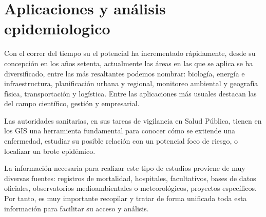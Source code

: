 \section{Aplicaciones y análisis epidemiologico}
\label{sec:cap2-aplicaciones-analisis-epidemiologico}

Con el correr del tiempo su el potencial ha incrementado rápidamente, desde su concepción en los años setenta,
actualmente las áreas en las que se aplica se ha diversificado, entre las más resaltantes podemos nombrar:
biología, energía e infraestructura, planificación urbana y regional, monitoreo ambiental y geografía física,
transportación y logística. Entre las aplicaciones más usuales destacan las del campo científico, gestión 
y empresarial.

Las autoridades sanitarias, en sus tareas de vigilancia en Salud Pública, tienen en los GIS una 
herramienta fundamental para conocer cómo se extiende una enfermedad, estudiar su posible relación 
con un potencial foco de riesgo, o localizar un brote epidémico\cite{vgomesAegis2001}.

La información necesaria para realizar este tipo de estudios proviene de muy diversas fuentes: 
registros de mortalidad, hospitales, facultativos, bases de datos oficiales, observatorios 
medioambientales o meteorológicos, proyectos específicos. Por tanto, es muy importante 
recopilar y tratar de forma unificada toda esta información para facilitar su acceso y análisis.

